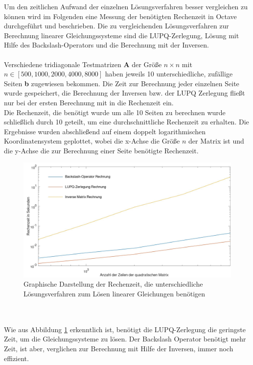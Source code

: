 Um den zeitlichen Aufwand der einzelnen Lösungsverfahren besser vergleichen zu können wird im Folgenden eine Messung der benötigten Rechenzeit in Octave durchgeführt und beschrieben. Die zu vergleichenden Lösungsverfahren zur Berechnung linearer Gleichungssysteme sind die LUPQ-Zerlegung, Lösung mit Hilfe des Backslash-Operators und die Berechnung mit der Inversen.\\ \\
Verschiedene tridiagonale Testmatrizen \textbf{A} der Größe $n \times n$ mit $n \in [500, 1000, 2000, 4000, 8000]$ haben jeweils 10 unterschiedliche, zufällige Seiten \textbf{b} zugewiesen bekommen. Die Zeit zur Berechnung jeder einzelnen Seite wurde gespeichert, die Berechnung der Inversen bzw. der LUPQ Zerlegung fließt nur bei der ersten Berechnung mit in die Rechenzeit ein. \\
Die Rechenzeit, die benötigt wurde um alle 10 Seiten zu berechnen wurde schließlich durch 10 geteilt, um eine durchschnittliche Rechenzeit zu erhalten. Die Ergebnisse wurden abschließend auf einem doppelt logarithmischen Koordinatensystem geplottet, wobei die x-Achse die Größe $n$ der Matrix ist und die y-Achse die zur Berechnung einer Seite benötigte Rechenzeit.
\begin{figure}
	\includegraphics[width=\textwidth]{data/LaufzeitPlot}
	\caption{Graphische Darstellung der Rechenzeit, die unterschiedliche Lösungsverfahren zum Lösen linearer Gleichungen benötigen}
	\label{fig:Laufzeit}
\end{figure}
\\ \\
Wie aus Abbildung \ref{fig:Laufzeit} erkenntlich ist, benötigt die LUPQ-Zerlegung die geringste Zeit, um die Gleichungssysteme zu lösen. Der Backslash Operator benötigt mehr Zeit, ist aber, verglichen zur Berechnung mit Hilfe der Inversen, immer noch effizient. 